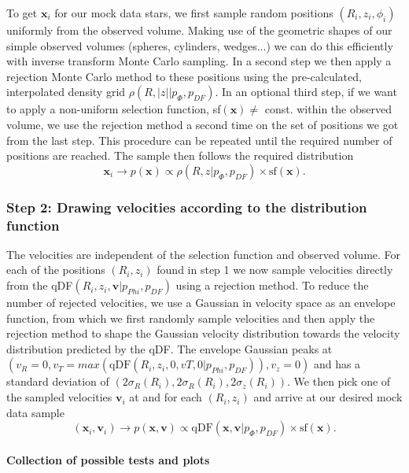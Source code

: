 \documentclass[12pt,preprint]{aastex}
\newcommand{\vect}[1]{\boldsymbol{#1}} %
\begin{document}
To get $\vect{x}_i$ for our mock data stars, we first sample random positions $(R_i,z_i,\phi_i)$ uniformly from the observed volume. Making use of the geometric shapes of our simple observed volumes (spheres, cylinders, wedges...) we can do this efficiently with inverse transform Monte Carlo sampling. In a second step we then apply a rejection Monte Carlo method to these positions using the pre-calculated, interpolated density grid $\rho(R,|z||p_{\Phi},p_{DF})$. In an optional third step, if we want to apply a non-uniform selection function, sf$(\vect{x}) \neq $ const. within the observed volume, we use the rejection method a second time on the set of positions we got from the last step. This procedure can be repeated until the required number of positions are reached. The sample then follows the required distribution
\begin{equation*}
\vect{x}_i \longrightarrow p(\vect{x}) \propto \rho(R,z|p_{\Phi},p_{DF}) \times \text{sf}(\vect{x}).
\end{equation*}

\subsubsection{Step 2: Drawing velocities according to the distribution function}

The velocities are independent of the selection function and observed volume. For each of the positions $(R_i,z_i)$ found in step 1 we now sample velocities directly from the qDF$(R_i,z_i,\vect{v}|p_{Phi},p_{DF})$ using a rejection method. To reduce the number of rejected velocities, we use a Gaussian in velocity space as an envelope function, from which we first randomly sample velocities and then apply the rejection method to shape the Gaussian velocity distribution towards the velocity distribution predicted by the qDF. The envelope Gaussian peaks at $(v_R=0,v_T=max(\text{qDF}(R_i,z_i,0,vT,0|p_{Phi},p_{DF})),v_z=0)$ and has a standard deviation of $(2\sigma_R(R_i),2\sigma_R(R_i),2\sigma_z(R_i))$. We then pick one of the sampled velocities $\vect{v}_i$ at and for each $(R_i,z_i)$ and arrive at our desired mock data sample
\begin{equation*}
(\vect{x}_i,\vect{v}_i) \longrightarrow p(\vect{x},\vect{v}) \propto \text{qDF}(\vect{x},\vect{v}|p_{\Phi},p_{DF}) \times \text{sf}(\vect{x}).
\end{equation*} 

\paragraph{Collection of possible tests and plots}
\end{document}
